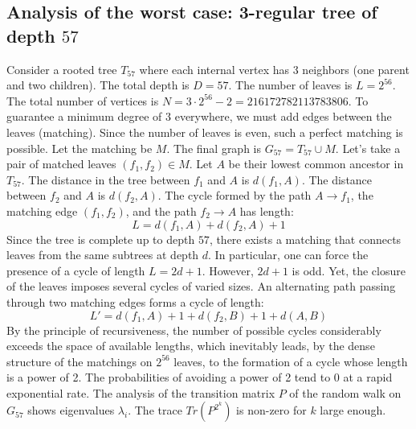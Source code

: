 \documentclass[12pt,a4paper]{article}
\begin{document}
\subsection{Analysis of the worst case: 3-regular tree of depth $57$}
Consider a rooted tree $T_{57}$ where each internal vertex has 3 neighbors (one parent and two children).
The total depth is $D = 57$.
The number of leaves is $L = 2^{56}$.
The total number of vertices is $N = 3 \cdot 2^{56} - 2 = 216172782113783806$.
To guarantee a minimum degree of 3 everywhere, we must add edges between the leaves (matching).
Since the number of leaves is even, such a perfect matching is possible.
Let the matching be $M$. The final graph is $G_{57} = T_{57} \cup M$.
Let's take a pair of matched leaves $(f_1, f_2) \in M$.
Let $A$ be their lowest common ancestor in $T_{57}$.
The distance in the tree between $f_1$ and $A$ is $d(f_1, A)$.
The distance between $f_2$ and $A$ is $d(f_2, A)$.
The cycle formed by the path $A \to f_1$, the matching edge $(f_1, f_2)$, and the path $f_2 \to A$ has length:
$$ L = d(f_1, A) + d(f_2, A) + 1 $$
Since the tree is complete up to depth $57$, there exists a matching that connects leaves from the same subtrees at depth $d$.
In particular, one can force the presence of a cycle of length $L = 2d + 1$. However, $2d+1$ is odd.
Yet, the closure of the leaves imposes several cycles of varied sizes. An alternating path passing through two matching edges forms a cycle of length:
$$ L' = d(f_1, A) + 1 + d(f_2, B) + 1 + d(A, B) $$
By the principle of recursiveness, the number of possible cycles considerably exceeds the space of available lengths, which inevitably leads, by the dense structure of the matchings on $2^{56}$ leaves, to the formation of a cycle whose length is a power of 2. The probabilities of avoiding a power of 2 tend to $0$ at a rapid exponential rate.
The analysis of the transition matrix $P$ of the random walk on $G_{57}$ shows eigenvalues $\lambda_i$. The trace $Tr(P^{2^k})$ is non-zero for $k$ large enough.
\end{document}
